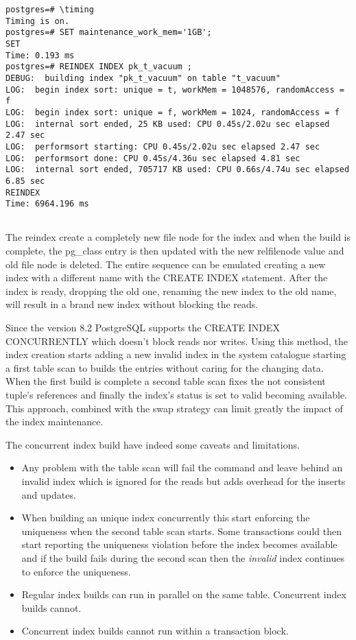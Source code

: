 \begin{lstlisting}[style=pgsql]
postgres=# \timing
Timing is on.
postgres=# SET maintenance_work_mem='1GB';
SET
Time: 0.193 ms
postgres=# REINDEX INDEX pk_t_vacuum ;
DEBUG:  building index "pk_t_vacuum" on table "t_vacuum"
LOG:  begin index sort: unique = t, workMem = 1048576, randomAccess = f
LOG:  begin index sort: unique = f, workMem = 1024, randomAccess = f
LOG:  internal sort ended, 25 KB used: CPU 0.45s/2.02u sec elapsed 2.47 sec
LOG:  performsort starting: CPU 0.45s/2.02u sec elapsed 2.47 sec
LOG:  performsort done: CPU 0.45s/4.36u sec elapsed 4.81 sec
LOG:  internal sort ended, 705717 KB used: CPU 0.66s/4.74u sec elapsed 6.85 sec
REINDEX
Time: 6964.196 ms


\end{lstlisting}

The reindex create a completely new file node for the index and when the build is complete, the 
pg\_class entry is then updated with the new relfilenode value and old file node is deleted. The 
entire sequence can be emulated creating a new index with a different name with the CREATE 
INDEX statement. After the index is ready, dropping the old one, renaming 
the new index to the old name, will result in a brand new index without blocking the 
reads.\newline

Since the version 8.2 PostgreSQL supports the CREATE INDEX CONCURRENTLY which doesn't block reads nor writes. Using this method, the index creation 
starts adding a new invalid index in the system catalogue starting a first table scan to builds 
the entries without caring for the changing data. When the first build is complete a second table 
scan fixes the not consistent tuple's references and finally the index's status is set to valid 
becoming available. This approach, combined with the swap strategy can limit greatly the 
impact of the index maintenance. \newline

The concurrent index build have indeed some caveats and limitations.
\begin{itemize}
 \item Any problem with the table scan will fail the command and leave behind an invalid index 
which is ignored for the reads but adds overhead for the inserts and updates.
\item When building an unique index concurrently this start enforcing the uniqueness when the 
second table scan starts. Some transactions could then start reporting the uniqueness violation 
before the index becomes available and if the build fails during the second scan then 
the \textit{invalid} index continues to enforce the uniqueness.
\item Regular index builds can run in parallel on the same table. Concurrent index builds cannot.
\item Concurrent index builds cannot run within a transaction block.
\end{itemize}


